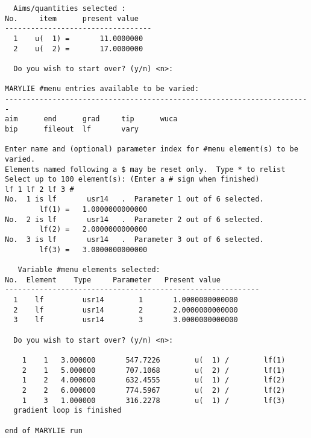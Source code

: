 \begin{footnotesize}
\begin{verbatim}
  Aims/quantities selected :
No.     item      present value
----------------------------------
  1    u(  1) =       11.0000000
  2    u(  2) =       17.0000000

  Do you wish to start over? (y/n) <n>:

MARYLIE #menu entries available to be varied:
-----------------------------------------------------------------------
aim      end      grad     tip      wuca
bip      fileout  lf       vary

Enter name and (optional) parameter index for #menu element(s) to be
varied.
Elements named following a $ may be reset only.  Type * to relist
Select up to 100 element(s): (Enter a # sign when finished)
lf 1 lf 2 lf 3 #
No.  1 is lf       usr14   .  Parameter 1 out of 6 selected.
        lf(1) =   1.0000000000000
No.  2 is lf       usr14   .  Parameter 2 out of 6 selected.
        lf(2) =   2.0000000000000
No.  3 is lf       usr14   .  Parameter 3 out of 6 selected.
        lf(3) =   3.0000000000000

   Variable #menu elements selected:
No.  Element    Type     Parameter   Present value
-----------------------------------------------------------
  1    lf         usr14        1       1.0000000000000
  2    lf         usr14        2       2.0000000000000
  3    lf         usr14        3       3.0000000000000

  Do you wish to start over? (y/n) <n>:

    1    1   3.000000       547.7226        u(  1) /        lf(1)
    2    1   5.000000       707.1068        u(  2) /        lf(1)
    1    2   4.000000       632.4555        u(  1) /        lf(2)
    2    2   6.000000       774.5967        u(  2) /        lf(2)
    1    3   1.000000       316.2278        u(  1) /        lf(3)
  gradient loop is finished

end of MARYLIE run\end{verbatim}
\end{footnotesize}

\newpage
